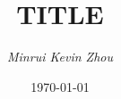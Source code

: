 \documentclass[11pt]{article} %
\begin{document}
\title{\sc TITLE} %
\author{\it Minrui Kevin Zhou} 
\date{\today}
\maketitle
\thispagestyle{empty}
\end{document}
